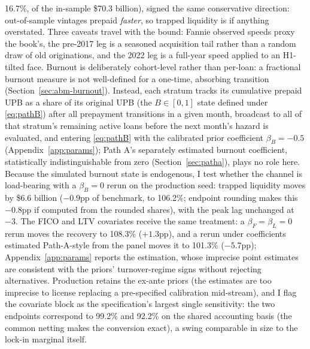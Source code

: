 \documentclass[12pt]{article}
\begin{document}
16.7\%, of the in-sample \$70.3 billion), signed the same conservative direction: out-of-sample vintages prepaid \emph{faster}, so trapped liquidity is if anything overstated. Three caveats travel with the bound: Fannie observed speeds proxy the book's, the pre-2017 leg is a seasoned acquisition tail rather than a random draw of old originations, and the 2022 leg is a full-year speed applied to an H1-tilted face. Burnout is deliberately cohort-level rather than per-loan: a fractional burnout measure is not well-defined for a one-time, absorbing transition (Section~\ref{sec:abm-burnout}). Instead, each stratum tracks its cumulative prepaid UPB as a share of its original UPB (the $B \in [0,1]$ state defined under \eqref{eq:pathB}) after all prepayment transitions in a given month, broadcast to all of that stratum's remaining active loans before the next month's hazard is evaluated, and entering \eqref{eq:pathB} with the calibrated prior coefficient $\beta_B = -0.5$ (Appendix~\ref{app:params}); Path A's separately estimated burnout coefficient, statistically indistinguishable from zero (Section~\ref{sec:patha}), plays no role here. Because the simulated burnout state is endogenous, I test whether the channel is load-bearing with a $\beta_B = 0$ rerun on the production seed: trapped liquidity moves by \$6.6 billion ($-0.9$pp of benchmark, to 106.2\%; endpoint rounding makes this $-0.8$pp if computed from the rounded shares), with the peak lag unchanged at $-3$. The FICO and LTV covariates receive the same treatment: a $\beta_F = \beta_L = 0$ rerun moves the recovery to 108.3\% ($+1.3$pp), and a rerun under coefficients estimated Path-A-style from the panel moves it to 101.3\% ($-5.7$pp); Appendix~\ref{app:params} reports the estimation, whose imprecise point estimates are consistent with the priors' turnover-regime signs without rejecting alternatives. Production retains the ex-ante priors (the estimates are too imprecise to license replacing a pre-specified calibration mid-stream), and I flag the covariate block as the specification's largest single sensitivity: the two endpoints correspond to 99.2\% and 92.2\% on the shared accounting basis (the common netting makes the conversion exact), a swing comparable in size to the lock-in marginal itself.
\end{document}
